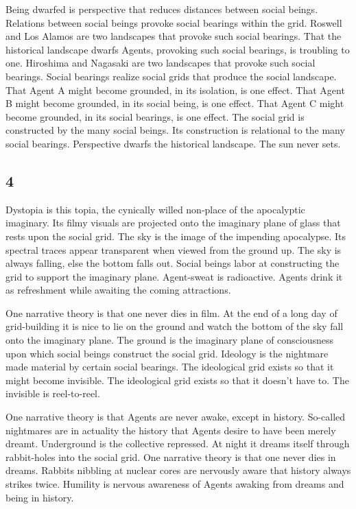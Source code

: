 Being dwarfed is perspective that reduces distances between social
beings. Relations between social beings provoke social bearings within
the grid. Roswell and Los Alamos are two landscapes that provoke such
social bearings. That the historical landscape dwarfs Agents, provoking
such social bearings, is troubling to one. Hiroshima and Nagasaki are
two landscapes that provoke such social bearings. Social bearings
realize social grids that produce the social landscape. That Agent A
might become grounded, in its isolation, is one effect. That Agent B
might become grounded, in its social being, is one effect. That Agent C
might become grounded, in its social bearings, is one effect. The social
grid is constructed by the many social beings. Its construction is
relational to the many social bearings. Perspective dwarfs the
historical landscape. The sun never sets.

\hypertarget{section-5}{%
\subsection{4}\label{section-5}}

Dystopia is this topia, the cynically willed non-place of the
apocalyptic imaginary. Its filmy visuals are projected onto the
imaginary plane of glass that rests upon the social grid. The sky is the
image of the impending apocalypse. Its spectral traces appear
transparent when viewed from the ground up. The sky is always falling,
else the bottom falls out. Social beings labor at constructing the grid
to support the imaginary plane. Agent-sweat is radioactive. Agents drink
it as refreshment while awaiting the coming attractions.

One narrative theory is that one never dies in film. At the end of a
long day of grid-building it is nice to lie on the ground and watch the
bottom of the sky fall onto the imaginary plane. The ground is the
imaginary plane of consciousness upon which social beings construct the
social grid. Ideology is the nightmare made material by certain social
bearings. The ideological grid exists so that it might become invisible.
The ideological grid exists so that it doesn't have to. The invisible is
reel-to-reel.

One narrative theory is that Agents are never awake, except in history.
So-called nightmares are in actuality the history that Agents desire to
have been merely dreamt. Underground is the collective repressed. At
night it dreams itself through rabbit-holes into the social grid. One
narrative theory is that one never dies in dreams. Rabbits nibbling at
nuclear cores are nervously aware that history always strikes twice.
Humility is nervous awareness of Agents awaking from dreams and being in
history.

